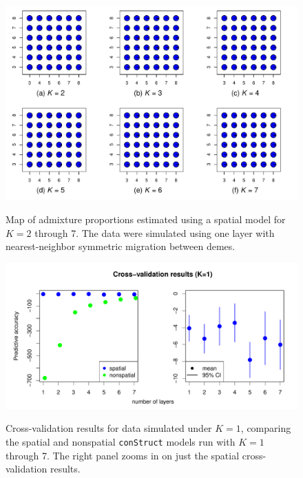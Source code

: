 \documentclass[10pt,letterpaper]{article}
\begin{document}
\begin{figure}
	\centering
		{\includegraphics[width=\textwidth]{figs/sims/simK1_sp_pies.pdf}}
	\caption{
	Map of admixture proportions estimated using a spatial model for $K=2$ through 7.
	The data were simulated using one layer with nearest-neighbor symmetric migration between demes.
    }\label{simK1_sp_pies}
\end{figure}

\begin{figure}
	\centering
		{\includegraphics[width=\textwidth]{figs/sims/simK1_std_xval.pdf}}
		\caption{
			Cross-validation results for data simulated under $K=1$,
			comparing the spatial and nonspatial \texttt{conStruct} models run with $K=1$ through 7.  
			The right panel zooms in on just the spatial cross-validation results.
		}\label{simK1_xval}
\end{figure}
\end{document}
